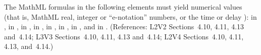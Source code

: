 The MathML formulas in the following elements must yield numerical
values (that is, MathML real, integer or ``e-notation'' numbers,
or the time or delay ):  in \KineticLaw,
 in \SpeciesReference,  in
\InitialAssignment,  in \AssignmentRule,  in
\RateRule,  in \AlgebraicRule,  in \Event
\Delay, and  in \EventAssignment.  (References: L2V2
Sections~4.10, 4.11, 4.13 and~4.14; L3V3 Sections~4.10, 4.11, 4.13 
and~4.14; L2V4 Sections~4.10, 4.11, 4.13, and~4.14.)


